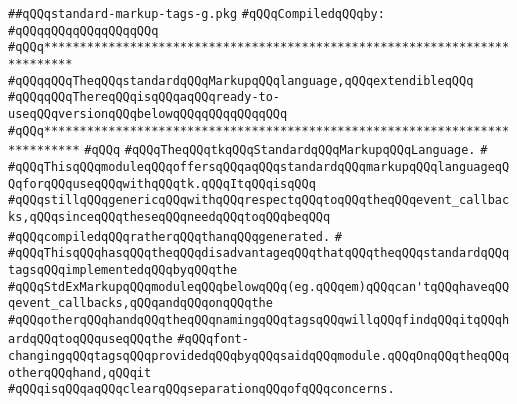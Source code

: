 \label{src/lib/tk/src/toolkit/standard-markup-tags-g.pkg}
\verb|##qQQqstandard-markup-tags-g.pkg|\newline
\newline
\verb|#qQQqCompiledqQQqby:|\newline
\verb|#qQQqqQQqqQQqqQQqqQQq|\newline
\newline
\newline
\newline
\newline
\verb|#qQQq**************************************************************************|\newline
\verb|#qQQqqQQqTheqQQqstandardqQQqMarkupqQQqlanguage,qQQqextendibleqQQq|\newline
\verb|#qQQqqQQqThereqQQqisqQQqaqQQqready-to-useqQQqversionqQQqbelowqQQqqQQqqQQqqQQq|\newline
\verb|#qQQq***************************************************************************|\newline
\verb|#qQQq|\newline
\verb|#qQQqTheqQQqtkqQQqStandardqQQqMarkupqQQqLanguage.|\newline
\verb|#|\newline
\verb|#qQQqThisqQQqmoduleqQQqoffersqQQqaqQQqstandardqQQqmarkupqQQqlanguageqQQqforqQQquseqQQqwithqQQqtk.qQQqItqQQqisqQQq|\newline
\verb|#qQQqstillqQQqgenericqQQqwithqQQqrespectqQQqtoqQQqtheqQQqevent_callbacks,qQQqsinceqQQqtheseqQQqneedqQQqtoqQQqbeqQQq|\newline
\verb|#qQQqcompiledqQQqratherqQQqthanqQQqgenerated.|\newline
\verb|#|\newline
\verb|#qQQqThisqQQqhasqQQqtheqQQqdisadvantageqQQqthatqQQqtheqQQqstandardqQQqtagsqQQqimplementedqQQqbyqQQqthe|\newline
\verb|#qQQqStdExMarkupqQQqmoduleqQQqbelowqQQq(eg.qQQqem)qQQqcan'tqQQqhaveqQQqevent_callbacks,qQQqandqQQqonqQQqthe|\newline
\verb|#qQQqotherqQQqhandqQQqtheqQQqnamingqQQqtagsqQQqwillqQQqfindqQQqitqQQqhardqQQqtoqQQquseqQQqthe|\newline
\verb|#qQQqfont-changingqQQqtagsqQQqprovidedqQQqbyqQQqsaidqQQqmodule.qQQqOnqQQqtheqQQqotherqQQqhand,qQQqit|\newline
\verb|#qQQqisqQQqaqQQqclearqQQqseparationqQQqofqQQqconcerns.|\newline
